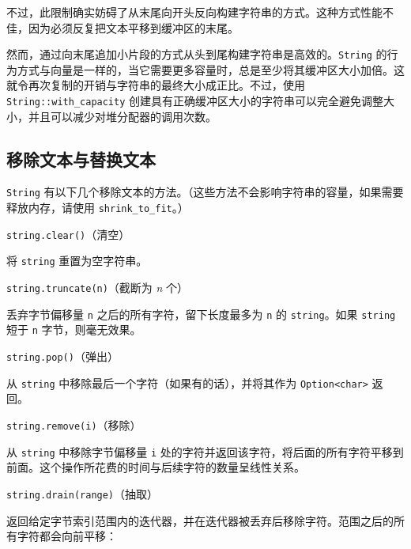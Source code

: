 不过，此限制确实妨碍了从末尾向开头反向构建字符串的方式。这种方式性能不佳，因为必须反复把文本平移到缓冲区的末尾。

然而，通过向末尾追加小片段的方式从头到尾构建字符串是高效的。\texttt{String} 的行为方式与向量是一样的，当它需要更多容量时，总是至少将其缓冲区大小加倍。这就令再次复制的开销与字符串的最终大小成正比。不过，使用 \texttt{String::with\_capacity} 创建具有正确缓冲区大小的字符串可以完全避免调整大小，并且可以减少对堆分配器的调用次数。

\subsection{移除文本与替换文本}

\texttt{String} 有以下几个移除文本的方法。（这些方法不会影响字符串的容量，如果需要释放内存，请使用 \texttt{shrink\_to\_fit}。）

\begin{mySidenote}
\texttt{string.clear()}（清空）
\end{mySidenote}

将 \texttt{string} 重置为空字符串。

\begin{mySidenote}
\texttt{string.truncate(n)}（截断为 \emph{n} 个）
\end{mySidenote}

丢弃字节偏移量 \texttt{n} 之后的所有字符，留下长度最多为 \texttt{n} 的 \texttt{string}。如果 \texttt{string} 短于 \texttt{n} 字节，则毫无效果。

\begin{mySidenote}
\texttt{string.pop()}（弹出）
\end{mySidenote}

从 \texttt{string} 中移除最后一个字符（如果有的话），并将其作为 \texttt{Option<char>} 返回。

\begin{mySidenote}
\texttt{string.remove(i)}（移除）
\end{mySidenote}

从 \texttt{string} 中移除字节偏移量 \texttt{i} 处的字符并返回该字符，将后面的所有字符平移到前面。这个操作所花费的时间与后续字符的数量呈线性关系。

\begin{mySidenote}
\texttt{string.drain(range)}（抽取）
\end{mySidenote}

返回给定字节索引范围内的迭代器，并在迭代器被丢弃后移除字符。范围之后的所有字符都会向前平移：

